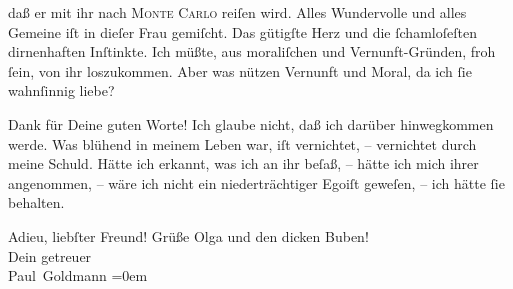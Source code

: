                daß er mit ihr nach \textsc{Monte Carlo} reiſen wird. Alles Wundervolle und alles Gemeine iſt in dieſer Frau gemiſcht. Das gütigſte
               Herz und die{ }ſchamloſeſten dirnenhaften Inſtinkte. Ich müßte, aus moraliſchen und
               Vernunft-Gründen, froh{ }ſein, von ihr loszukommen. Aber was nützen Vernunft und Moral,
               da ich{ }ſie wahnſinnig liebe?\pend
           
\pstart
           Dank für Deine guten Worte! {\pb}Ich glaube nicht, daß
               ich darüber hinwegkommen werde.  Was blühend in meinem Leben war, iſt vernichtet, –
               vernichtet durch meine Schuld. Hätte ich erkannt, was ich an ihr beſaß, – hätte ich
               mich ihrer angenommen, – wäre ich nicht ein niederträchtiger Egoiſt geweſen, – ich
               hätte{ }ſie behalten.\pend
           
\pstart
           Adieu, liebſter Freund! Grüße Olga und den
               dicken Buben! {\\[\baselineskip]}Dein
               getreuer {\\[\baselineskip]}\spacefill\mbox{Paul Goldmann}\pend
           \leftskip=0em{}\endnumbering{}  \newcommand{\dateiname}{L03360}\newcommand{\titel}{Paul Goldmann an Arthur Schnitzler, 3. 1. [1903]}\newcommand{\editorInnen}{Martin Anton Müller und Laura Untner}
